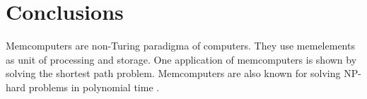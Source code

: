 \section{Conclusions}
\label{sec:conc}

Memcomputers are non-Turing paradigma of computers.
They use memelements as unit of processing and storage.
One application of memcomputers is shown by solving the shortest path problem.
Memcomputers are also known for solving NP-hard problems in polynomial time \citep{Traversa:2014vl}.
